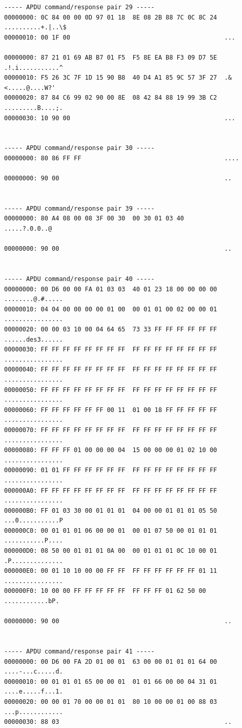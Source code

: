 \documentclass[bsc,frontabs,twoside,singlespacing,parskip,deptreport]{infthesis}     %
\begin{document}
\begin{appendices}
\begin{Verbatim}[commandchars=\\\{\}, fontsize=\small]
----- APDU command/response pair 29 -----
00000000: 0C 84 00 00 0D 97 01 18  8E 08 2B 88 7C 0C 8C 24  ..........+.|..\$
00000010: 00 1F 00                                          ...

00000000: 87 21 01 69 AB B7 01 F5  F5 8E EA B8 F3 09 D7 5E  .!.i...........^
00000010: F5 26 3C 7F 1D 15 90 B8  40 D4 A1 85 9C 57 3F 27  .&<.....@....W?'
00000020: 87 84 C6 99 02 90 00 8E  08 42 84 88 19 99 3B C2  .........B....;.
00000030: 10 90 00                                          ...


----- APDU command/response pair 30 -----
00000000: 80 86 FF FF                                       ....

00000000: 90 00                                             ..


----- APDU command/response pair 39 -----
00000000: 80 A4 08 00 08 3F 00 30  00 30 01 03 40           .....?.0.0..@

00000000: 90 00                                             ..


----- APDU command/response pair 40 -----
00000000: 00 D6 00 00 FA 01 03 03  40 01 23 18 00 00 00 00  ........@.#.....
00000010: 04 04 00 00 00 00 01 00  00 01 01 00 02 00 00 01  ................
00000020: 00 00 03 10 00 04 64 65  73 33 FF FF FF FF FF FF  ......des3......
00000030: FF FF FF FF FF FF FF FF  FF FF FF FF FF FF FF FF  ................
00000040: FF FF FF FF FF FF FF FF  FF FF FF FF FF FF FF FF  ................
00000050: FF FF FF FF FF FF FF FF  FF FF FF FF FF FF FF FF  ................
00000060: FF FF FF FF FF FF 00 11  01 00 18 FF FF FF FF FF  ................
00000070: FF FF FF FF FF FF FF FF  FF FF FF FF FF FF FF FF  ................
00000080: FF FF FF 01 00 00 00 04  15 00 00 00 01 02 10 00  ................
00000090: 01 01 FF FF FF FF FF FF  FF FF FF FF FF FF FF FF  ................
000000A0: FF FF FF FF FF FF FF FF  FF FF FF FF FF FF FF FF  ................
000000B0: FF 01 03 30 00 01 01 01  04 00 00 01 01 01 05 50  ...0...........P
000000C0: 00 01 01 01 06 00 00 01  00 01 07 50 00 01 01 01  ...........P....
000000D0: 08 50 00 01 01 01 0A 00  00 01 01 01 0C 10 00 01  .P..............
000000E0: 00 01 10 10 00 00 FF FF  FF FF FF FF FF FF 01 11  ................
000000F0: 10 00 00 FF FF FF FF FF  FF FF FF 01 62 50 00     ............bP.

00000000: 90 00                                             ..


----- APDU command/response pair 41 -----
00000000: 00 D6 00 FA 2D 01 00 01  63 00 00 01 01 01 64 00  ....-...c.....d.
00000010: 00 01 01 01 65 00 00 01  01 01 66 00 00 04 31 01  ....e.....f...1.
00000020: 00 00 01 70 00 00 01 01  80 10 00 00 01 00 88 03  ...p............
00000030: 88 03                                             ..


\end{Verbatim}
\end{appendices}
\end{document}
